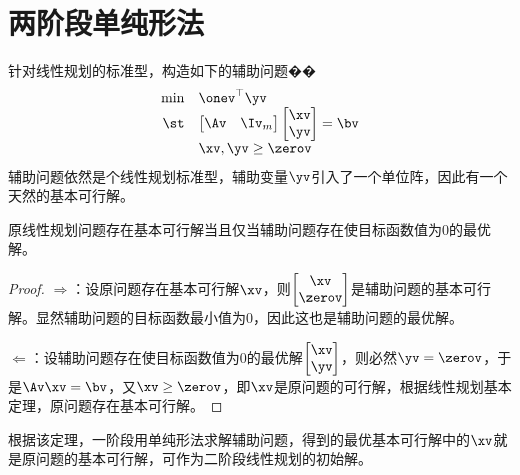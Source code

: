 \documentclass{ctexart}
\begin{document}
\section{两阶段单纯形法}

针对线性规划的标准型，构造如下的辅助问题��
\begin{align*}
    \begin{array}{rl}
        \min & \onev^\top \yv      \\
        \st  & \begin{bmatrix}
                   \Av & \Iv_m
               \end{bmatrix}
        \begin{bmatrix}
            \xv \\ \yv
        \end{bmatrix} = \bv        \\
             & \xv, \yv \ge \zerov
    \end{array}
\end{align*}
辅助问题依然是个线性规划标准型，辅助变量$\yv$引入了一个单位阵，因此有一个天然的基本可行解。

\begin{theorem}
    原线性规划问题存在基本可行解当且仅当辅助问题存在使目标函数值为$0$的最优解。
\end{theorem}

\begin{proof}
    $\Rightarrow$：设原问题存在基本可行解$\xv$，则$\begin{bmatrix}
            \xv \\ \zerov
        \end{bmatrix}$是辅助问题的基本可行解。显然辅助问题的目标函数最小值为$0$，因此这也是辅助问题的最优解。

    $\Leftarrow$：设辅助问题存在使目标函数值为$0$的最优解$\begin{bmatrix}
            \xv \\ \yv
        \end{bmatrix}$，则必然$\yv = \zerov$，于是$\Av \xv = \bv$，又$\xv \ge \zerov$，即$\xv$是原问题的可行解，根据线性规划基本定理，原问题存在基本可行解。
\end{proof}

根据该定理，一阶段用单纯形法求解辅助问题，得到的最优基本可行解中的$\xv$就是原问题的基本可行解，可作为二阶段线性规划的初始解。
\end{document}
